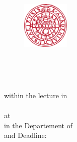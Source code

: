 
\begin{titlepage}


\begin{figure}
	\raggedright
	\includegraphics[width=0.2\textwidth]{./fig/uppsla_university.png}
\end{figure}


\begin{center}
	\vspace*{0pt}
	\begin{Huge}
		\textbf{\mytitle}\\
	\end{Huge}
	\vspace*{4em}
	\begin{LARGE}
		\textbf{\MakeUppercase{\mytypeofwork}}\\
	\end{LARGE}	
	\vspace*{2em}
	within the lecture in\\
	\mycourse\\
	\vspace*{2em}
	at \myuniversity\\
	in the Departement of \mydepartement\\
	\vspace*{2em}
	\myauthora{} and \myauthorb{}
	\vspace*{2em}
	Deadline: \myduedate\\
	\vspace*{3em}
	\vfill
	

\end{center}
\end{titlepage}
